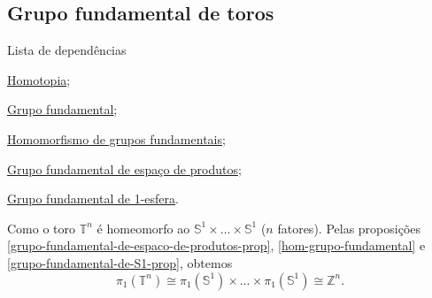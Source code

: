 \subsection{Grupo fundamental de toros}
\label{grupo-fundamental-de-toro-ex}
\begin{titlemize}{Lista de dependências}
    \item \hyperref[homotopia-def]{Homotopia};\\
    \item \hyperref[grupo-fundamental]{Grupo fundamental};\\
    \item \hyperref[hom-grupo-fundamental]{Homomorfismo de grupos fundamentais};\\
    \item \hyperref[grupo-fundamental-de-espaco-de-produtos-prop]{Grupo fundamental de espaço de produtos};\\
    \item \hyperref[grupo-fundamental-de-S1-prop]{Grupo fundamental de 1-esfera}.
    
\end{titlemize}

\begin{ex}
    Como o toro $\mathbb{T}^n$ é homeomorfo ao $\mathbb{S}^1\times \ldots \times \mathbb{S}^1$ ($n$ fatores). Pelas proposições \ref{grupo-fundamental-de-espaco-de-produtos-prop}, \ref{hom-grupo-fundamental} e \ref{grupo-fundamental-de-S1-prop}, obtemos 
    \[\pi_1(\mathbb{T}^n)\cong \pi_1(\mathbb{S}^1)\times\ldots\times\pi_1(\mathbb{S}^1)\cong\mathbb{Z}^n.\]
\end{ex}
